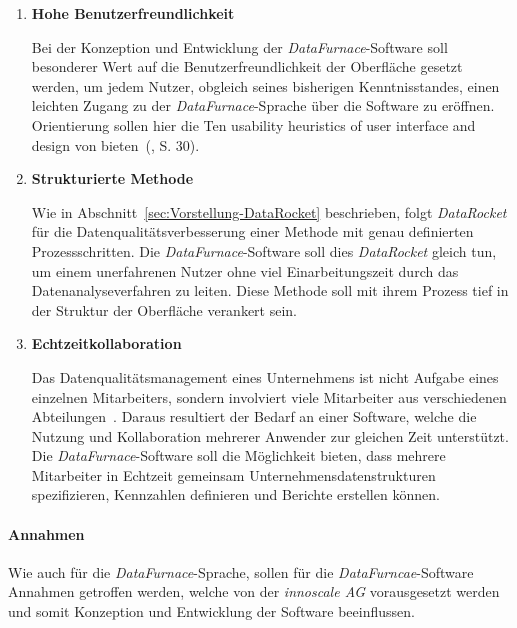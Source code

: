 \documentclass[
  language=german, %
  type=bachelor,%
  ngerman
]{isthesis}
\begin{document}
\begin{content}
\begin{enumerate}
    \item \textbf{Hohe Benutzerfreundlichkeit}

      Bei der Konzeption und Entwicklung der \textit{DataFurnace}-Software soll
      besonderer Wert auf die Benutzerfreundlichkeit der Oberfläche gesetzt
      werden, um jedem Nutzer, obgleich seines bisherigen Kenntnisstandes,  einen
      leichten Zugang zu der \textit{DataFurnace}-Sprache über die Software zu
      eröffnen. Orientierung sollen hier die \glqq{}Ten usability heuristics of
      user interface and design\grqq{} von
      \textsc{\citeauthor{nielsen1994heuristic}}
      bieten~(\citeyear{nielsen1994heuristic}, S. 30).

    \item \textbf{Strukturierte Methode}

      Wie in Abschnitt~\ref{sec:Vorstellung-DataRocket} beschrieben, folgt
      \textit{DataRocket} für die Datenqualitätsverbesserung einer Methode mit
      genau definierten Prozessschritten. Die \textit{DataFurnace}-Software
      soll dies \textit{DataRocket} gleich tun, um einem unerfahrenen Nutzer
      ohne viel Einarbeitungszeit durch das Datenanalyseverfahren zu leiten.
      Diese Methode soll mit ihrem Prozess tief in der Struktur der Oberfläche
      verankert sein.

    \item \textbf{Echtzeitkollaboration}

			Das Datenqualitätsmanagement eines Unternehmens ist nicht Aufgabe eines
			einzelnen Mitarbeiters, sondern involviert viele Mitarbeiter aus
			verschiedenen Abteilungen~\cite[][S. 2]{geiger2004data}. Daraus resultiert der
			Bedarf an einer Software, welche die Nutzung und Kollaboration mehrerer
			Anwender zur gleichen Zeit unterstützt. Die \textit{DataFurnace}-Software
			soll die Möglichkeit bieten, dass mehrere Mitarbeiter in Echtzeit gemeinsam
			Unternehmensdatenstrukturen spezifizieren, Kennzahlen
			definieren und Berichte erstellen können.
      
  \end{enumerate}


	\paragraph{Annahmen} Wie auch für die \textit{DataFurnace}-Sprache, sollen
	für die \textit{DataFurncae}-Software Annahmen getroffen werden, welche von der
	\textit{innoscale AG} vorausgesetzt werden und somit Konzeption und
	Entwicklung der Software beeinflussen.


\end{content}
\end{document}
